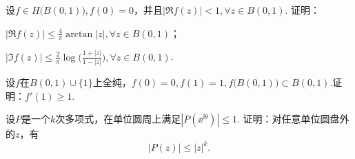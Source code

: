 \begin{xiti}
\item 设$f\in H\big(B(0,1)\big),f(0)=0$，并且$|\Re f(z)|<1,\forall z\in B(0,1)$. 证明：
\begin{enuma}
  \item $|\Re f(z)|\le\frac4\pi\arctan|z|,\forall z\in B(0,1)$；
  \item $|\Im f(z)|\le\frac2\pi\log\bigg(\frac{1+|z|}{1-|z|}\bigg),\forall z\in B(0,1)$.
\end{enuma}
\item 设$f$在$B(0,1)\cup\{1\}$上全纯，$f(0)=0,f(1)=1,f\big(B(0,1)\big)\subset B(0,1)$.证明：$f'(1)\ge1$.
\item 设$P$是一个$k$次多项式，在单位圆周上满足$|P(\ee^{\ii\theta})|\le1$. 证明：对任意单位圆盘外的$z$，有
    \[|P(z)|\le |z|^k.\]
\end{xiti} 